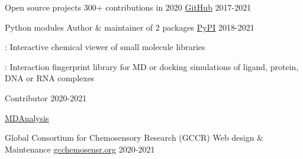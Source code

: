 
\begin{cventries}

  \cventry
    {Open source projects}
    {300+ contributions in 2020}
    {\href{https://github.com/cbouy/}{GitHub}}
    {2017-2021}
    {}

  \cventry
    {Python modules}
    {Author \& maintainer of 2 packages}
    {\href{https://pypi.org/user/cbouy/}{PyPI}}
    {2018-2021}
    {
      \begin{cvitems}
        \item{: Interactive chemical viewer of small molecule libraries}
        \item{: Interaction fingerprint library for MD or docking simulations of ligand, protein, DNA or RNA complexes}
      \end{cvitems}
    }
  
  \vspace{-1.5mm}
  \cventry
    {}
    {Contributor}
    {}
    {2020-2021}
    {
      \begin{cvitems}
        \item{\href{https://github.com/MDAnalysis/mdanalysis/commits?author=cbouy}{MDAnalysis}}
      \end{cvitems}
    }

  \cventry
    {Global Consortium for Chemosensory Research (GCCR)}
    {Web design \& Maintenance}
    {\href{https://gcchemosensr.org/}{gcchemosensr.org}}
    {2020-2021}
    {}

\end{cventries}
